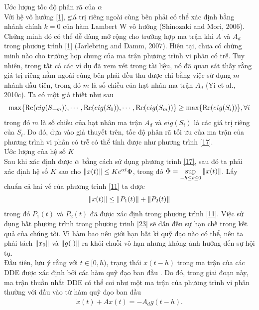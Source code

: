 \begin{cm}
Ước lượng tốc độ phân rã của $\alpha$\\
	Với hệ vô hướng \eqref{1}, giá trị riêng ngoài cùng bên phải có thể xác định bằng nhánh chính $k =0$ của hàm Lambert W vô hướng (Shinozaki and Mori, 2006). Chứng minh đó có thể dễ dàng mở rộng cho trường hợp ma trận khi $A$ và $A_d$ trong phương trình \eqref{1} (Jarlebring	and Damm, 2007). Hiện tại, chưa có chứng minh nào cho trường hợp chung của ma trận phương trình vi phân có trễ. Tuy nhiên, trong tất cả các ví dụ đã xem xét trong tài liệu,  nó đã quan sát thấy rằng giá trị riêng nằm ngoài cùng bên phải đều thu được chỉ bằng việc sử dụng $m$ nhánh đầu tiên, trong đó $m$ là số chiều của hạt nhân ma trận $A_d$ (Yi et al., 2010c). Ta có một giả thiết như sau
	\begin{align}\label{22}
		\max \{\mathrm{Re} (eig(S_{-m})), \cdots, \mathrm{Re} (eig(S_{0})), \cdots, \mathrm{Re} (eig(S_{m})) \} \ge \max \{ \mathrm{Re} (eig(S_{i}))\} , \forall i
	\end{align} 
	trong đó $m$ là số chiều của hạt nhân ma trận $A_d$ và $eig(S_i)$ là các giá trị riêng của $S_i$. Do đó, dựa vào giả thuyết trên, tốc độ phân rã tối ưu của ma trận của phương trình vi phân có trễ  có thể tính được như phương trình \eqref{17}.\\
Ước lượng của hệ số $K$\\
	Sau khi xác định được $\alpha$ bằng cách sử dụng phương trình \eqref{17}, sau đó ta phải xác định hệ số $K$ sao cho $\Vert x(t) \Vert \le K e^{\alpha t} \Phi$, trong đó $\Phi = \sup\limits_{-h \le t \le 0} \Vert x(t) \Vert$. 	Lấy chuẩn cả hai vế của phương trình \eqref{11} ta được
\begin{align}\label{23}
	\Vert x(t) \Vert \le \Vert P_1(t) \Vert + \Vert P_2(t)\Vert
\end{align}	
trong đó $P_1(t)$ và $P_2(t)$ đã được xác định trong phương trình \eqref{11}. Việc sử dụng bất phương trình trong phương trinh \eqref{23} sẽ dẫn đến sự hạn chế  trong kết quả của chúng tôi. Vì hàm bao nên giới hạn bất kì quỹ đạo nào có thể, nên ta phải tách $\Vert x_0 \Vert$ và $\Vert g (.) \Vert$ ra khỏi chuỗi vô hạn nhưng không ảnh hưởng đến sự hội tụ.\\
Đầu tiên, lưu ý rằng với $t \in [0,h)$,  trạng thái $x(t-h)$ trong ma trận của các DDE được xác định bởi các hàm quỹ đạo ban đầu . Do đó, trong giai đoạn này, ma trận thuần nhất DDE có thể coi như một ma trận của phương trình vi phân thường với đầu vào từ hàm quỹ đạo ban đầu 
\begin{align}\label{24}
	\dot{x}(t) + Ax(t) = -A_dg(t-h).
\end{align}

\end{cm}
